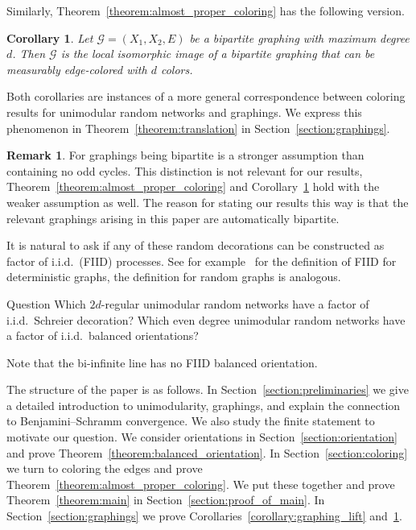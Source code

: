 \documentclass[11pt]{article}
\newtheorem{coro}[theo]{Corollary}
\theoremstyle{definition}
\newtheorem*{rema*}{Remark}
\newenvironment{enonce*}[1]{\par\medskip\noindent\textbf{#1.}\itshape}{\par\medskip}
\numberwithin{equation}{section}
\numberwithin{figure}{section}
\numberwithin{table}{section}
\newcommand{\G}{\mathcal{G}}
\begin{document}
Similarly, Theorem~\ref{theorem:almost_proper_coloring} has the following version.

\begin{coro}\label{corollary:proper_coloring_lift}
Let $\G=(X_1,X_2,E)$ be a bipartite graphing with maximum degree $d$. Then $\G$ is the local isomorphic image of a bipartite graphing that can be measurably edge-colored with $d$ colors.
\end{coro}

\noindent Both corollaries are instances of a more general correspondence between coloring results for unimodular random networks and graphings. We express this phenomenon in Theorem~\ref{theorem:translation} in Section~\ref{section:graphings}.

\begin{rema*}
For graphings being bipartite is a stronger assumption than containing no odd cycles. This distinction is not relevant for our results, Theorem~\ref{theorem:almost_proper_coloring} and Corollary~\ref{corollary:proper_coloring_lift} hold with the weaker assumption as well. The reason for stating our results this way is that the relevant graphings arising in this paper are automatically bipartite.
\end{rema*}

\noindent It is natural to ask if any of these random decorations can be constructed as factor of i.i.d.\ (FIID) processes. See for example~\cite{csoka2017invariant} for the definition of FIID for deterministic graphs, the definition for random graphs is analogous.

\begin{enonce*}{Question}
Which $2d$-regular unimodular random networks have a factor of i.i.d.\ Schreier decoration? Which even degree unimodular random networks have a factor of i.i.d.\ balanced orientations?
\end{enonce*}

\noindent Note that the bi-infinite line has no FIID balanced orientation.

\goodbreak

The structure of the paper is as follows. In Section~\ref{section:preliminaries} we give a detailed introduction to unimodularity, graphings, and explain the connection to Benjamini--Schramm convergence. We also study the finite statement to motivate our question. We consider orientations in Section~\ref{section:orientation} and prove Theorem~\ref{theorem:balanced_orientation}. In Section~\ref{section:coloring} we turn to coloring the edges and prove Theorem~\ref{theorem:almost_proper_coloring}. We put these together and prove Theorem~\ref{theorem:main} in Section~\ref{section:proof_of_main}. In Section~\ref{section:graphings} we prove Corollaries~\ref{corollary:graphing_lift} and~\ref{corollary:proper_coloring_lift}.
\end{document}
